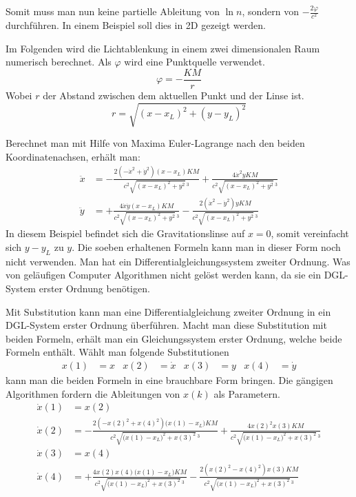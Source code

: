 \begin{refsection}
Somit muss man nun keine partielle Ableitung von \(\ln n\), sondern von
\(-\frac{2\varphi}{c^2}\) durchführen.  In einem Beispiel soll dies in
2D gezeigt werden.

\begin{beispiel}
  Im Folgenden wird die Lichtablenkung in einem zwei dimensionalen
  Raum numerisch berechnet.  Als \(\varphi\) wird eine Punktquelle
  verwendet.
  \begin{equation*}
    \varphi = -\frac{KM}{r}
  \end{equation*}
  Wobei \(r\) der Abstand zwischen dem aktuellen Punkt und der Linse
  ist.
  \begin{equation*}
    r = \sqrt{(x-x_L)^2+(y-y_L)^2}
  \end{equation*}

  Berechnet man mit Hilfe von Maxima Euler-Lagrange nach den beiden
  Koordinatenachsen, erhält man:
  \begin{align*}
    \ddot{x} &= -\frac{2(-\dot{x}^2+\dot{y}^2)(x-x_L)KM}
               {c^2\sqrt{(x-x_L)^2+y^2}\,^3}+
               \frac{4\dot{x}^2yKM}{c^2\sqrt{(x-x_L)^2+y^2}\,^3}\\
    \ddot{y} &= +\frac{4\dot{x}\dot{y}(x-x_L)KM}{c^2\sqrt{(x-x_L)^2+y^2}\,^3}
               - \frac{2(\dot{x}^2-\dot{y}^2)yKM}
               {c^2\sqrt{(x-x_L)^2+y^2}\,^3}
  \end{align*}
  In diesem Beispiel befindet sich die Gravitationslinse auf \(x=0\),
  somit vereinfacht sich \(y-y_L\) zu \(y\).  Die soeben erhaltenen
  Formeln kann man in dieser Form noch nicht verwenden.  Man hat ein
  Differentialgleichungssystem zweiter Ordnung.  Was von geläufigen
  Computer Algorithmen nicht gelöst werden kann, da sie ein DGL-System
  erster Ordnung benötigen.

  Mit Substitution kann man eine Differentialgleichung zweiter Ordnung
  in ein DGL-System erster Ordnung überführen.  Macht man diese
  Substitution mit beiden Formeln, erhält man ein Gleichungssystem
  erster Ordnung, welche beide Formeln enthält.  Wählt man folgende
  Substitutionen
  \begin{align*}
    x(1) &= x &x(2) &= \dot{x} &x(3) &= y &x(4) &= \dot{y}
  \end{align*}
  kann man die beiden Formeln in eine brauchbare Form bringen.  Die
  gängigen Algorithmen fordern die Ableitungen von \(x(k)\) als
  Parametern.
  \begin{align*}
    \dot{x}(1) &= x(2)\\
    \dot{x}(2) &= -\frac{2\left(-x(2)^2+x(4)^2\right)\bigl(x(1)-x_L\bigr)KM}
                 {c^2\sqrt{\bigl(x(1)-x_L\bigr)^2+x(3)^2}\,^3}
                 + \frac{4 x(2)^2 x(3) KM}
                 {c^2\sqrt{\bigl(x(1)-x_L\bigr)^2+x(3)^2}\,^3}\\
    \dot{x}(3) &= x(4)\\
    \dot{x}(4) &= +\frac{4x(2)x(4)\bigl(x(1)-x_L\bigr)KM}
                 {c^2\sqrt{\bigl(x(1)-x_L\bigr)^2+x(3)^2}\,^3}
                 - \frac{2 \left(x(2)^2-x(4)^2\right) x(3) KM}
                 {c^2\sqrt{\bigl(x(1)-x_L\bigr)^2+x(3)^2}\,^3}
  \end{align*}


\end{beispiel}
\end{refsection}
